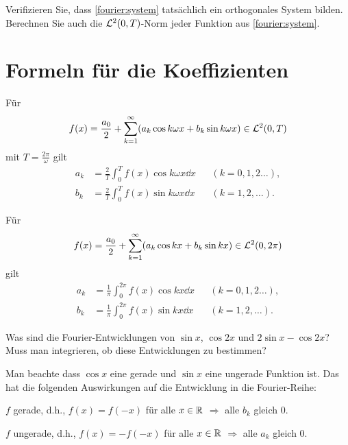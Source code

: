 \begin{aufg} 
	Verifizieren Sie, dass \eqref{fourier:system} tatsächlich ein orthogonales System bilden. Berechnen Sie auch die $\mathcal{L}^2(0,T)$-Norm jeder Funktion aus \eqref{fourier:system}.
\end{aufg} 



\section{Formeln für die Koeffizienten}

\begin{bem} 
	Für
	\[
		f(x) = \frac{a_0}{2} + \sum_{k=1}^\infty (a_k \cos k \omega x + b_k \sin k \omega x) \in \mathcal{L}^2(0,T)
	\]
	mit $T = \frac{2 \pi}{\omega}$
	gilt  
	\begin{align*}
		a_k & = \frac{2}{T} \int_0^T f(x) \cos k \omega x \dd x & & (k=0,1,2\ldots),
	\\	b_k & = \frac{2}{T} \int_0^T f(x) \sin k \omega x \dd x & & (k=1,2,\ldots).
	\end{align*}
\end{bem} 

\begin{bem}[Formeln für die Koeffizienten der Fourier-Reihe im Fall $\omega =1$] 
	Für
	\[
	f(x) = \frac{a_0}{2} + \sum_{k=1}^\infty (a_k \cos k x + b_k \sin k x) \in \mathcal{L}^2(0,2 \pi)
	\]
	gilt  
	\begin{align*}
	a_k & = \frac{1}{\pi} \int_0^{2\pi} f(x) \cos k  x \dd x & & (k=0,1,2\ldots),
	\\	b_k & = \frac{1}{\pi} \int_0^{2 \pi} f(x) \sin k x \dd x & & (k=1,2,\ldots).
	\end{align*}
\end{bem} 

\begin{aufg}[Realitätscheck] 
	Was sind die Fourier-Entwicklungen von $\sin x$, $\cos 2x$ und $2 \sin x - \cos 2x$? Muss man integrieren, ob diese Entwicklungen zu bestimmen? 
\end{aufg} 


\begin{bem}
	Man beachte dass $\cos x$ eine gerade und $\sin x$ eine ungerade Funktion ist. Das hat die folgenden Auswirkungen auf die Entwicklung in die Fourier-Reihe: 
	\begin{enuma}
		\item $f$ gerade, d.h., $f(x) = f(-x)$ für alle $x \in \mathbb{R}$ $\Longrightarrow$ alle $b_k$ gleich $0$. 
		\item $f$ ungerade, d.h., $f(x) = -f(-x)$ für alle $x \in \mathbb{R}$ $\Longrightarrow$ alle $a_k$ gleich $0$. 
	\end{enuma} 
\end{bem} 

